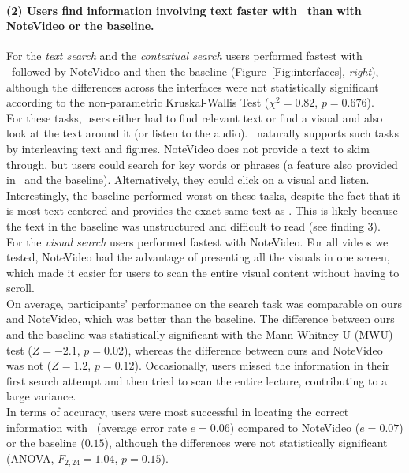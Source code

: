 \paragraph{(2) Users find information involving text faster with \systemname\ than with NoteVideo or the baseline.}
For the \textit{text search} and  the \textit{contextual search} users performed fastest with \systemname\  followed by NoteVideo and then the baseline (Figure~\ref{Fig:interfaces}, \textit{right}), although the differences across the interfaces were not statistically significant according to the non-parametric Kruskal-Wallis Test ($\chi^2=0.82$,
$p=0.676$).\\ 
For these tasks, users either had to find relevant text or find a visual and also look at the text around it (or listen to the audio). \systemname\ naturally supports such tasks by  interleaving text and figures. NoteVideo does not provide a text to skim through, but users could search for key words or phrases (a feature also provided in \systemname\ and the baseline). Alternatively, they could click on a visual and listen. Interestingly, the baseline performed worst on these tasks, despite the fact that it is most text-centered and  provides the exact same text as \systemname . This is likely because the text in the baseline was unstructured and difficult to read (see finding 3).\\
For the \textit{visual search} users performed fastest with NoteVideo. For
all videos we tested, NoteVideo had the advantage of presenting all the visuals
in one screen, which made it easier for users to scan the entire visual content
without having to scroll.\\
On average, participants' performance on the search task was comparable on
ours and NoteVideo, which was better than the baseline. The difference between
ours and the baseline was statistically significant with the Mann-Whitney
U (MWU) test ($Z=-2.1$, $p=0.02$), whereas the difference between ours and
NoteVideo was not ($Z=1.2$, $p=0.12$). Occasionally, users missed the information in their first search attempt and  then tried to scan the entire lecture, contributing to a large variance.  \\
In terms of accuracy, users were most successful in locating the correct information with \systemname\ (average error rate $e=0.06$) compared to NoteVideo ($e=0.07$) or the baseline ($0.15$), although the differences were not statistically significant (ANOVA, $F_{2,24}=1.04$, $p=0.15$).

